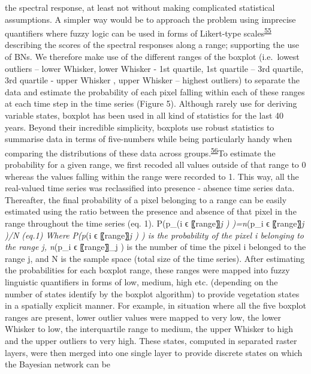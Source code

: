 \documentclass[12pt,oneside]{article}
\begin{document}
the spectral response, at least not without making complicated
statistical assumptions. A simpler way would be to approach the problem
using imprecise quantifiers where fuzzy logic can be used in forms of
Likert-type
scales\textsuperscript{\protect\hyperlink{ref-Likert_1932}{55}}
describing the scores of the spectral responses along a range;
supporting the use of BNs. We therefore make use of the different ranges
of the boxplot (i.e.~lowest outliers -- lower Whisker, lower Whisker -
1st quartile, 1st quartile -- 3rd quartile, 3rd quartile - upper Whisker
, upper Whisker -- highest outliers) to separate the data and estimate
the probability of each pixel falling within each of these ranges at
each time step in the time series (Figure 5). Although rarely use for
deriving variable states, boxplot has been used in all kind of
statistics for the last 40 years. Beyond their incredible simplicity,
boxplots use robust statistics to summarise data in terms of
five-numbers while being particularly handy when comparing the
distributions of these data across
groups.\textsuperscript{\protect\hyperlink{ref-Wickham_and_Stryjewski_2012}{56}}To
estimate the probability for a given range, we first recoded all values
outside of that range to 0 whereas the values falling within the range
were recorded to 1. This way, all the real-valued time series was
reclassified into presence - absence time series data. Thereafter, the
final probability of a pixel belonging to a range can be easily
estimated using the ratio between the presence and absence of that pixel
in the range throughout the time series (eq. 1). P(p\_(i ϵ
〖range〗\emph{j ) )=n}(p\_i ϵ 〖range〗\emph{j )/N (eq.1) Where P(p}(i
ϵ 〖range〗\emph{j ) ) is the probability of the pixel i belonging to
the range j, n}(p\_i ϵ 〖range〗\_j ) is the number of time the pixel i
belonged to the range j, and N is the sample space (total size of the
time series). After estimating the probabilities for each boxplot range,
these ranges were mapped into fuzzy linguistic quantifiers in forms of
low, medium, high etc. (depending on the number of states identify by
the boxplot algorithm) to provide vegetation states in a spatially
explicit manner. For example, in situation where all the five boxplot
ranges are present, lower outlier values were mapped to very low, the
lower Whisker to low, the interquartile range to medium, the upper
Whisker to high and the upper outliers to very high. These states,
computed in separated raster layers, were then merged into one single
layer to provide discrete states on which the Bayesian network can be
\end{document}

